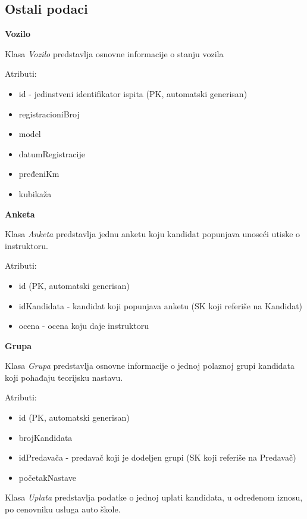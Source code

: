 \subsection{Ostali podaci}

\textbf{\large Vozilo}
\vspace{0.3cm}

Klasa \textit{Vozilo} predstavlja osnovne informacije o stanju vozila

Atributi:
\begin{itemize}
    \item id - jedinstveni identifikator ispita (PK, automatski generisan)
    \item registracioniBroj
    \item model
    \item datumRegistracije
    \item pređeniKm
    \item kubikaža
\end{itemize}

\textbf{\large Anketa}
\vspace{0.3cm}

Klasa \textit{Anketa} predstavlja jednu anketu koju kandidat popunjava unoseći utiske o instruktoru.

Atributi:
\begin{itemize}
    \item id (PK, automatski generisan)
    \item idKandidata - kandidat koji popunjava anketu (SK koji referiše na Kandidat)
    \item ocena - ocena koju daje instruktoru
\end{itemize}

\textbf{\large Grupa}
\vspace{0.3cm}

Klasa \textit{Grupa} predstavlja osnovne informacije o jednoj polaznoj grupi kandidata koji pohađaju teorijsku nastavu.

Atributi:
\begin{itemize}
    \item id (PK, automatski generisan)
    \item brojKandidata 
    \item idPredavača - predavač koji je dodeljen grupi (SK koji referiše na Predavač)
    \item početakNastave
\end{itemize}

Klasa \textit{Uplata} predstavlja podatke o jednoj uplati kandidata, u određenom iznosu, po cenovniku usluga auto škole.

